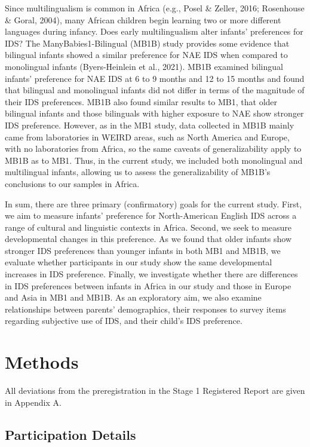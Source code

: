 \documentclass[
  english,
  ,man,floatsintext]{apa6}
\begin{document}
Since multilingualism is common in Africa (e.g., Posel \& Zeller, 2016; Rosenhouse \& Goral, 2004), many African children begin learning two or more different languages during infancy. Does early multilingualism alter infants' preferences for IDS? The ManyBabies1-Bilingual (MB1B) study provides some evidence that bilingual infants showed a similar preference for NAE IDS when compared to monolingual infants (Byers-Heinlein et al., 2021). MB1B examined bilingual infants' preference for NAE IDS at 6 to 9 months and 12 to 15 months and found that bilingual and monolingual infants did not differ in terms of the magnitude of their IDS preferences. MB1B also found similar results to MB1, that older bilingual infants and those bilinguals with higher exposure to NAE show stronger IDS preference. However, as in the MB1 study, data collected in MB1B mainly came from laboratories in WEIRD areas, such as North America and Europe, with no laboratories from Africa, so the same caveats of generalizability apply to MB1B as to MB1. Thus, in the current study, we included both monolingual and multilingual infants, allowing us to assess the generalizability of MB1B's conclusions to our samples in Africa.

In sum, there are three primary (confirmatory) goals for the current study. First, we aim to measure infants' preference for North-American English IDS across a range of cultural and linguistic contexts in Africa. Second, we seek to measure developmental changes in this preference. As we found that older infants show stronger IDS preferences than younger infants in both MB1 and MB1B, we evaluate whether participants in our study show the same developmental increases in IDS preference. Finally, we investigate whether there are differences in IDS preferences between infants in Africa in our study and those in Europe and Asia in MB1 and MB1B. As an exploratory aim, we also examine relationships between parents' demographics, their responses to survey items regarding subjective use of IDS, and their child's IDS preference.

\section{Methods}\label{methods}

All deviations from the preregistration in the Stage 1 Registered Report are given in Appendix A.

\subsection{Participation Details}\label{participation-details}
\end{document}
